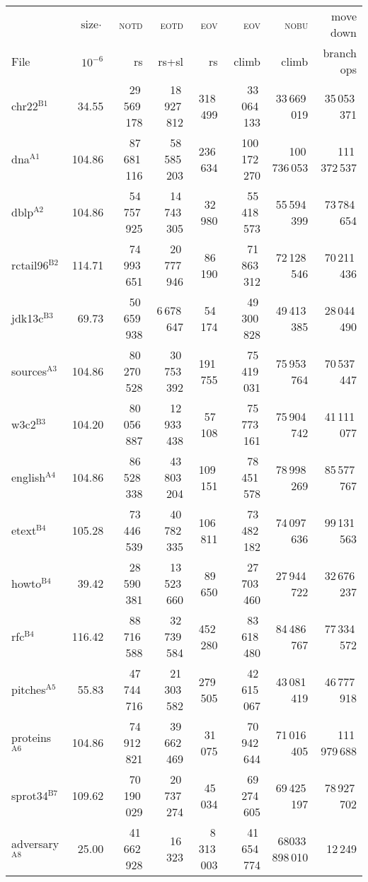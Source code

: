 \documentclass{llncs}
\newcommand\tstrut{\rule{0pt}{2.4ex}}
\newcommand\notd{\textsc{notd}\xspace}
\newcommand\nobu{\textsc{nobu}\xspace}
\newcommand\eotd{\textsc{eotd}\xspace}
\newcommand\eov{\textsc{eov}\xspace}
\begin{document}
\begin{table}
  \begin{center}
    \scriptsize
    \addtolength{\tabcolsep}{.3ex}
    \begin{tabular}{lrrrrrrr}
	&	$\text{size}\cdot$&	\notd&	\eotd &	\eov  &	\eov &	\nobu & move down\\
	File&	$10^{-6}$& rs&	rs+sl&	rs&	climb&	climb&	branch ops \\[.5ex] \hline
		chr22$^{\text{B1}}$&	34.55&	29\,569\,178&	18\,927\,812&
                318\,499&	33\,064\,133&	33\,669\,019&	35\,053\,371 \tstrut \\
		dna$^{\text{A1}}$&		104.86&	87\,681\,116&	58\,585\,203&	236\,634&	100\,172\,270&	100\,736\,053&	111\,372\,537 \\
		dblp$^{\text{A2}}$&		104.86&	54\,757\,925&	14\,743\,305&	32\,980&	55\,418\,573&	55\,594\,399&	73\,784\,654 \\
		rctail96$^{\text{B2}}$&	114.71&	74\,993\,651&	20\,777\,946&	86\,190&	71\,863\,312&	72\,128\,546&	70\,211\,436 \\
		jdk13c$^{\text{B3}}$&	69.73&	50\,659\,938&	6\,678\,647&	54\,174&	49\,300\,828&	49\,413\,385&	28\,044\,490 \\
		sources$^{\text{A3}}$&	104.86&	80\,270\,528&	30\,753\,392&	191\,755&	75\,419\,031&	75\,953\,764&	70\,537\,447 \\
		w3c2$^{\text{B3}}$&		104.20&	80\,056\,887&	12\,933\,438&	57\,108&	75\,773\,161&	75\,904\,742&	41\,111\,077 \\
		english$^{\text{A4}}$&	104.86&	86\,528\,338&	43\,803\,204&	109\,151&	78\,451\,578&	78\,998\,269&	85\,577\,767 \\
		etext$^{\text{B4}}$&	105.28&	73\,446\,539&	40\,782\,335&	106\,811&	73\,482\,182&	74\,097\,636&	99\,131\,563 \\
		howto$^{\text{B4}}$&	39.42&	28\,590\,381&	13\,523\,660&	89\,650&	27\,703\,460&	27\,944\,722&	32\,676\,237 \\
		rfc$^{\text{B4}}$&		116.42&	88\,716\,588&	32\,739\,584&	452\,280&	83\,618\,480&	84\,486\,767&	77\,334\,572 \\
		pitches$^{\text{A5}}$&	55.83&	47\,744\,716&	21\,303\,582&	279\,505&	42\,615\,067&	43\,081\,419&	46\,777\,918 \\
		proteins$^{\text{A6}}$&	104.86&	74\,912\,821&	39\,662\,469&	31\,075&	70\,942\,644&	71\,016\,405&	111\,979\,688 \\
		sprot34$^{\text{B7}}$&	109.62&	70\,190\,029&	20\,737\,274&	45\,034&	69\,274\,605&	69\,425\,197&	78\,927\,702 \\
		adversary$^{\text{A8}}$&	25.00&	41\,662\,928&	16\,323&	8\,313\,003&	41\,654\,774&	68033\,898\,010&	12\,249 \\	
      \end{tabular}
      \end{center}


\end{table}
\end{document}
